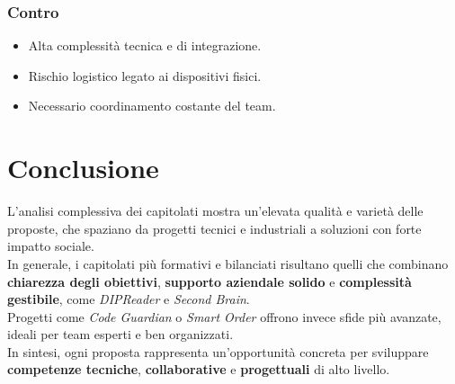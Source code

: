\documentclass[a4paper, 11pt, oneside]{scrartcl} %
\begin{document}
\subsubsection*{Contro}
\begin{itemize}
    \item Alta complessità tecnica e di integrazione.
    \item Rischio logistico legato ai dispositivi fisici.
    \item Necessario coordinamento costante del team.
\end{itemize}


\section{Conclusione}

L’analisi complessiva dei capitolati mostra un’elevata qualità e varietà delle proposte, che spaziano da progetti tecnici e industriali a soluzioni con forte impatto sociale.\\[0.5em]
In generale, i capitolati più formativi e bilanciati risultano quelli che combinano \textbf{chiarezza degli obiettivi}, \textbf{supporto aziendale solido} e \textbf{complessità gestibile}, come \textit{DIPReader} e \textit{Second Brain}.\\[0.5em]
Progetti come \textit{Code Guardian} o \textit{Smart Order} offrono invece sfide più avanzate, ideali per team esperti e ben organizzati.\\[0.5em]
In sintesi, ogni proposta rappresenta un’opportunità concreta per sviluppare \textbf{competenze tecniche}, \textbf{collaborative} e \textbf{progettuali} di alto livello.

\end{document}
